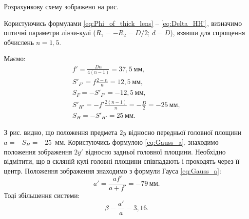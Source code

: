 \begin{solutionexample}

	Розрахункову схему зображено на рис.
	\begin{center}
		
	\end{center}

	Користуючись формулами \eqref{eq:Phi_of_thick_lens} -- \eqref{eq:Delta_HH'}, визначимо оптичні параметри лінзи-кулі
	($R_1 = - R_2 = D/2$; $d = D$), взявши для спрощення обчислень $n=1,5$.

	Маємо:
	\begin{align*}
		f' = \frac{Dn}{4(n - 1)} = 37,5\ \text{мм},                       \\
		S'_{F'} = f \frac{2 - n}{n} = 12,5\ \text{мм},                    \\
		S_{F} = - S'_{F'} = -12,5\ \text{мм},                             \\
		S'_{H'} = -f'\frac{2(n - 1)}{n} = -\frac{D}{2} = - 25\ \text{мм}, \\
		S_H = - S'_{H'} = 25\ \text{мм}.
	\end{align*}

	З рис. видно, що положення предмета $2y$ відносно передньої головної
	площини $a = -S_H = -25$~мм. Користуючись формулою \eqref{eq:Gauss_a}, знаходимо
	положення зображення $2y'$ відносно задньої головної площини. Необхідно
	відмітити, що в скляній кулі головні площини співпадають і проходять
	через її центр. Положення зображення знаходимо з формули Гауса \eqref{eq:Gauss_a}:
	\begin{equation*}
		a' = \frac{af'}{a + f'} = -79\ \text{мм}.
	\end{equation*}
	Тоді збільшення системи:
	\begin{equation*}
		\beta = \frac{a'}{a} = 3,16.
	\end{equation*}
\end{solutionexample}

